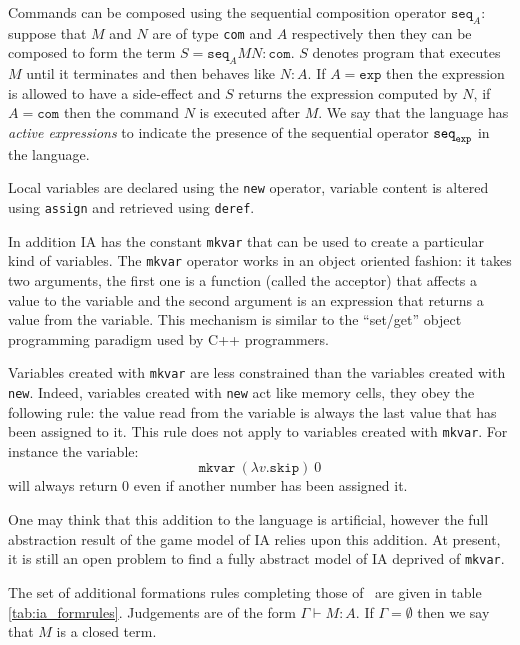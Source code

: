 Commands can be composed using the sequential composition operator
$\texttt{seq}_A$: suppose that $M$ and $N$ are of type \texttt{com}
and $A$ respectively then they can be composed to form the term $S =
\texttt{seq}_A M N : \texttt{com}$. $S$ denotes program that
executes $M$ until it terminates and then behaves like $N:A$. If $A
= \texttt{exp}$ then the expression is allowed to have a side-effect
and $S$ returns the expression computed by $N$, if $A =
\texttt{com}$ then the command $N$ is executed after $M$. We say
that the language has \emph{active expressions} to indicate the
presence of the sequential operator $\texttt{seq}_{\texttt{exp}}$ in the
language.


Local variables are
declared using the \texttt{new} operator, variable content is altered
using \texttt{assign} and retrieved using \texttt{deref}.

In addition IA has the constant \texttt{mkvar} that can be used to
create a particular kind of variables. The \texttt{mkvar} operator
works in an object oriented fashion: it takes two arguments, the
first one is a function (called the acceptor) that affects a value
to the variable and the second argument is an expression that
returns a value from the variable. This mechanism is similar to
the ``set/get'' object programming paradigm used by C++ programmers.

Variables created with \texttt{mkvar} are less constrained than the
variables created with \texttt{new}. Indeed, variables created with
\texttt{new} act like memory cells, they obey the following rule:
the value read from the variable is always the last value that has
been assigned to it. This rule does not apply to variables created
with \texttt{mkvar}. For instance the variable:
$$\texttt{mkvar}\ (\lambda v.\texttt{skip})\ 0$$
will always return $0$ even if another number has been assigned it.


One may think that this addition to the language is artificial,
however the full abstraction result of the game model of IA relies
upon this addition. At present, it is still an open problem to find
a fully abstract model of IA deprived of \texttt{mkvar}.

The set of additional formations rules completing those of \pcf\ are
given in table \ref{tab:ia_formrules}. Judgements are of the form
$\Gamma \vdash M : A$. If $\Gamma = \emptyset$ then we say that $M$
is a closed term.

